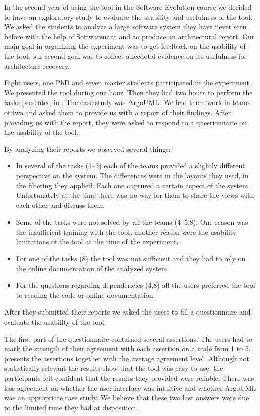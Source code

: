 \documentclass[preprint,12pt]{elsarticle}
\begin{document}
In the second year of using the tool in the Software Evolution course we decided to have an exploratory study to evaluate the usability and usefulness of the tool. We asked the students to analyze a large software system they have never seen before with the help of Softwarenaut and to produce an architectural report. Our main goal in organizing the experiment was to get feedback on the usability of the tool; our second goal was to collect anecdotal evidence on its usefulness for architecture recovery.

Eight users, one PhD and seven master students participated in the experiment. We presented the tool during one hour. Then they had two hours to perform the tasks presented in . The case study was ArgoUML. We had them work in teams of two and asked them to provide us with a report of their findings. After providing us with the report, they were asked to respond to a questionnaire on the usability of the tool. 


By analyzing their reports we observed several things:

\begin{itemize}
\item In several of the tasks (1--3) each of the teams provided a slightly different perspective on the system. The differences were in the layouts they used, in the filtering they applied. Each one captured a certain aspect of the system. Unfortunately at the time there was no way for them to share the views with each other and discuss them.
\item Some of the tasks were not solved by all the teams (4--5,8). One reason was the insufficient training with the tool, another reason were the usability limitations of the tool at the time of the experiment. %
\item For one of the tasks (8) the tool was not sufficient and they had to rely on the online documentation of the analyzed system. 
\item For the questions regarding dependencies (4,8) all the users preferred the tool to reading the code or online documentation.
\end{itemize}

After they submitted their reports we asked the users to fill a questionnaire and evaluate the usability of the tool. 

The first part of the questionnaire contained several assertions. The users had to mark the strength of their agreement with each assertion on a scale from 1 to 5.  presents the assertions together with the average agreement level. Although not statistically relevant the results show that the tool was easy to use, the participants felt confident that the results they provided were reliable.%
 There was less agreement on whether the user interface was intuitive and whether ArgoUML was an appropriate case study. We believe that these two last answers were due to the limited time they had at disposition. %
\end{document}
